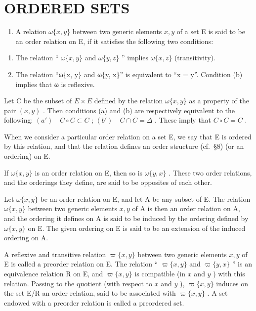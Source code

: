 \section{ORDERED SETS}

\begin{enumerate}
\def\labelenumi{\arabic{enumi}.}
\tightlist
\item
  A relation \(\omega\{x, y\}\) between two generic elements \(x, y\) of a set E is said to be an order relation on E, if it satisfies the following two conditions:
\end{enumerate}

\begin{enumerate}
\def\labelenumi{(\alph{enumi})}
\item
  The relation `` \(\omega \{x, y\}\) and \(\omega \{y, z\}\) '' implies \(\omega \{x, z\}\) (transitivity).
\item
  The relation ``ω\{x, y\} and ω\{y, x\}'' is equivalent to ``x = y''. Condition (b) implies that ω is reflexive.
\end{enumerate}

Let C be the subset of \(E \times E\) defined by the relation \(\omega\{x, y\}\) as a property of the pair \((x, y)\) . Then conditions (a) and (b) are respectively equivalent to the following: \((a') \quad C \circ C \subset C\) ; \((b') \quad C \cap \overline{C} = \Delta\) . These imply that \(C \circ C = C\) .

When we consider a particular order relation on a set E, we say that E is ordered by this relation, and that the relation defines an order structure (cf.~§8) (or an ordering) on E.

If \(\omega\{x,y\}\) is an order relation on E, then so is \(\omega\{y,x\}\) . These two order relations, and the orderings they define, are said to be opposites of each other.

Let \(\omega\{x, y\}\) be an order relation on E, and let A be any subset of E. The relation \(\omega\{x, y\}\) between two generic elements \(x, y\) of A is then an order relation on A, and the ordering it defines on A is said to be induced by the ordering defined by \(\omega\{x, y\}\) on E. The given ordering on E is said to be an extension of the induced ordering on A.

A reflexive and transitive relation \(\varpi\{x, y\}\) between two generic elements \(x, y\) of E is called a preorder relation on E. The relation `` \(\varpi\{x, y\}\) and \(\varpi\{y, x\}\) '' is an equivalence relation R on E, and \(\varpi\{x, y\}\) is compatible (in \(x\) and \(y\) ) with this relation. Passing to the quotient (with respect to \(x\) and \(y\) ), \(\varpi\{x, y\}\) induces on the set E/R an order relation, said to be associated with \(\varpi\{x, y\}\) . A set endowed with a preorder relation is called a preordered set.

